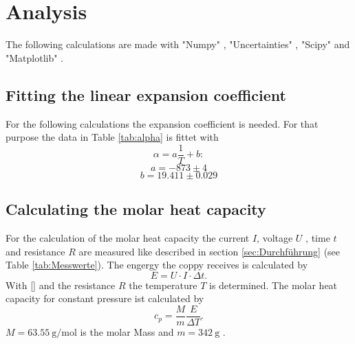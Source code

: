 \section{Analysis}
\label{sec:Auswertung}
The following calculations are made with  "Numpy" \cite{numpy}, 
"Uncertainties" \cite{uncertainties}, 
"Scipy" \cite{scipy} and  "Matplotlib" \cite{matplotlib}.

\subsection{Fitting the linear expansion coefficient}
For the following calculations the expansion coefficient is needed.
For that purpose the data in Table \ref{tab:alpha}
is fittet with
\begin{equation*}
    \alpha = a \frac{1}{T} + b:
\end{equation*}
\begin{equation*}
    a = -873 \pm 4
\end{equation*}
\begin{equation*}
    b= 19.411 \pm 0.029
\end{equation*}


\subsection{Calculating the molar heat capacity}
For the calculation of the molar heat capacity 
the current $I$, voltage $U$ , time $t$ and resistance $R$ are measured 
like described in section \ref{sec:Durchführung} (see Table \ref{tab:Messwerte}).
\newline \newline
\noindent The engergy the coppy receives is calculated by 
\begin{equation}
    E = U \cdot I \cdot \Delta t .
\end{equation}
\noindent With \eqref{} and the resistance $R$ the temperature $T$ is determined.
The molar heat capacity for constant pressure ist calculated by
\begin{equation}
    c_p = \frac{ M}{m} \frac{E}{\Delta T}.
\end{equation}
\noindent $M = \qty{63.55}{\g\per\mole}$ is the molar Mass and
$m= \qty{342}{\g}$ \cite{Molmasse_kupfer}\cite{V47}.

